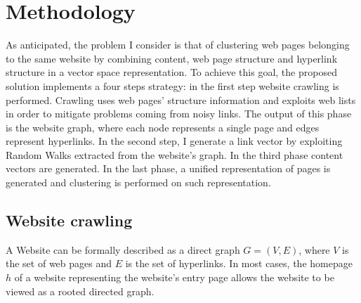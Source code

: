 \section{Methodology}
\label{2sec:method}
\noindent As anticipated, the problem I consider is that of clustering web pages belonging to the same website by combining content, web page structure and  hyperlink structure in a vector space representation. To achieve this goal, the proposed solution  implements a four steps strategy: in the first step website crawling is performed. Crawling uses web pages' structure information and exploits web lists in order to mitigate problems coming from noisy links. The output of this phase is the website graph, where each node represents a single page and edges represent hyperlinks. In the second step, I generate a link vector by exploiting Random Walks extracted from the website's graph. In the third phase content vectors are generated. In the last phase, a unified representation of pages is generated and clustering is performed on such representation. 



\subsection{Website crawling}
\label{3Crawling}
A Website can be formally described as a direct  graph $G = (V,E) $, where $V$ is the set of web pages and $E$ is the set of hyperlinks. In most cases, the homepage $h$ of a website representing the website's  entry  page  allows  the  website  to  be  viewed  as  a rooted directed graph. 



